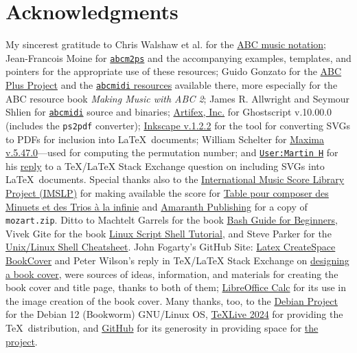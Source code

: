 \documentclass[a4paper,x11names,svgnames,10pt]{article}
\begin{document}
{\section{Acknowledgments}
My sincerest gratitude to Chris Walshaw et al. for the \href{http://www.abcnotation.com/}{ABC music notation}; Jean-Francois Moine for \href{http://moinejf.free.fr/}{\tt abcm2ps} and the accompanying examples, templates, and pointers for the appropriate use of these resources; Guido Gonzato for the \href{http://abcplus.sourceforge.net/}{ABC Plus Project} and the \href{http://abcplus.sourceforge.net/#abcMIDI}{{\tt abcmidi} resources} available there, more especially for the ABC resource book {\em Making Music with ABC 2}; James R. Allwright and Seymour Shlien for \href{http://abc.sourceforge.net/abcMIDI}{\tt abcmidi} source and binaries; \href{https://artifex.com/}{Artifex, Inc.} for Ghostscript v.10.00.0 (includes the {\tt ps2pdf} converter); \href{https://www.inkscape.org/}{Inkscape v.1.2.2} for the tool for converting SVGs to PDFs for inclusion into \LaTeX\ documents; William Schelter for \href{https://maxima.sourceforge.io}{Maxima v.5.47.0}---used for computing the permutation number; and \href{https://tex.stackexchange.com/users/632/martin-h}{\tt User:Martin H} for his \href{https://tex.stackexchange.com/questions/2099/how-to-include-svg-diagrams-in-latex}{reply} to a TeX/LaTeX Stack Exchange question on including SVGs into \LaTeX\ documents. Special thanks also to the \href{http://imslp.org/}{International Music Score Library Project (IMSLP)} for making available the score for \href{http://imslp.org/wiki/Table\_pour\_composer\_des\_Minuets\_et\_des\_Trios\_\%C3\%A0\_la\_infinie\_(Stadler,_Maximilian)}{
Table pour composer des Minuets et des Trios à la infinie} and \href{https://www.amaranthpublishing.com/MozartDiceGame.htm}{Amaranth Publishing} for a copy of {\tt mozart.zip}. Ditto to Machtelt Garrels for the book \href{http://tldp.org/LDP/Bash-Beginners-Guide/html/Bash-Beginners-Guide.html}{Bash Guide for Beginners}, Vivek Gite for the book \href{http://www.freeos.com/guides/lsst/}{Linux Script Shell Tutorial}, and Steve Parker for the \href{http://steve-parker.org/sh/cheatsheet.pdf}{Unix/Linux Shell Cheatsheet}. John Fogarty's GitHub Site: \href{https://github.com/jfogarty/latex-createspace-bookcover}{Latex CreateSpace BookCover} and Peter Wilson's reply in TeX/LaTeX Stack Exchange on \href{https://tex.stackexchange.com/questions/17579/how-can-i-design-a-book-cover}{designing a book cover}, were sources of ideas, information, and materials for creating the book cover and title page, thanks to both of them; \href{http://www.libreoffice.org/}{LibreOffice Calc} for its use in the image creation of the book cover.  Many thanks, too, to the \href{https://www.debian.org}{Debian Project} for the Debian 12 (Bookworm) GNU/Linux OS, \href{http://www.tug.org/texlive/}{TeXLive 2024} for providing the \TeX\ distribution,  and \href{https://github.com}{GitHub} for its generosity in providing space for \href{https://github.com/justineuro/mdgBookSVG4Kit}{the project}.  

}
\end{document}
